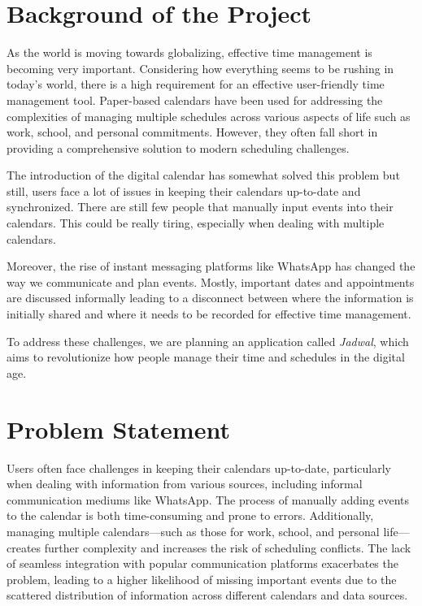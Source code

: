 \documentclass[12pt,a4paper]{article}
\begin{document}
\tableofcontents
\clearpage

\doublespacing

\section{Background of the Project}

As the world is moving towards globalizing, effective time management is becoming very important. Considering how everything seems to be rushing in today's world, there is a high requirement for an effective user-friendly time management tool. Paper-based calendars have been used for addressing the complexities of managing multiple schedules across various aspects of life such as work, school, and personal commitments. However, they often fall short in providing a comprehensive solution to modern scheduling challenges.

The introduction of the digital calendar has somewhat solved this problem but still, users face a lot of issues in keeping their calendars up-to-date and synchronized. There are still few people that manually input events into their calendars. This could be really tiring, especially when dealing with multiple calendars.

Moreover, the rise of instant messaging platforms like WhatsApp has changed the way we communicate and plan events. Mostly, important dates and appointments are discussed informally leading to a disconnect between where the information is initially shared and where it needs to be recorded for effective time management.

To address these challenges, we are planning an application called \textit{Jadwal}, which aims to revolutionize how people manage their time and schedules in the digital age.

\section{Problem Statement}

Users often face challenges in keeping their calendars up-to-date, particularly when dealing with information from various sources, including informal communication mediums like WhatsApp. The process of manually adding events to the calendar is both time-consuming and prone to errors. Additionally, managing multiple calendars—such as those for work, school, and personal life—creates further complexity and increases the risk of scheduling conflicts. The lack of seamless integration with popular communication platforms exacerbates the problem, leading to a higher likelihood of missing important events due to the scattered distribution of information across different calendars and data sources.
\end{document}
